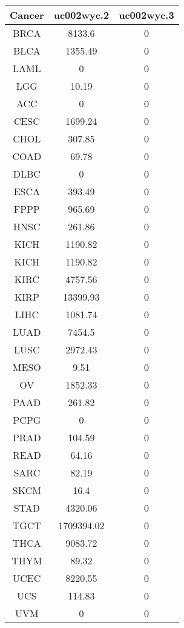\documentclass[11pt,a4paper]{report}
\author{Mazid OSSENI}
\begin{document}
\begin{tabular}{|c|c|c|}
\hline 
Cancer & uc002wyc.2 & uc002wyc.3 \\ 
\hline 
BRCA & 8133.6 & 0 \\ 
\hline 
BLCA & 1355.49 & 0 \\ 
\hline 
LAML & 0 & 0 \\ 
\hline 
LGG & 10.19 & 0 \\ 
\hline 
ACC & 0 & 0 \\ 
\hline 
CESC & 1699.24 & 0 \\ 
\hline 
CHOL & 307.85 & 0 \\ 
\hline 
COAD & 69.78 & 0 \\ 
\hline 
DLBC & 0 & 0 \\ 
\hline 
ESCA & 393.49 & 0 \\ 
\hline 
FPPP & 965.69 & 0 \\ 
\hline 
HNSC & 261.86 & 0 \\ 
\hline 
KICH & 1190.82 & 0 \\ 
\hline
KICH & 1190.82 & 0 \\ 
\hline
KIRC & 4757.56 & 0 \\ 
\hline
KIRP & 13399.93 & 0 \\ 
\hline
LIHC & 1081.74 & 0 \\ 
\hline
LUAD & 7454.5 & 0 \\
\hline
LUSC & 2972.43 & 0 \\
\hline
MESO & 9.51 & 0 \\
\hline
OV & 1852.33 & 0 \\
\hline
PAAD & 261.82 & 0 \\
\hline
PCPG & 0 & 0 \\
\hline
PRAD & 104.59 & 0 \\
\hline
READ & 64.16 & 0 \\
\hline
SARC & 82.19 & 0 \\
\hline
SKCM & 16.4 & 0 \\
\hline
STAD & 4320.06 & 0 \\
\hline
TGCT & 1709394.02 & 0 \\
\hline
THCA & 9083.72 & 0 \\
\hline
THYM & 89.32 & 0 \\
\hline
UCEC & 8220.55 & 0 \\
\hline
UCS & 114.83 & 0 \\
\hline
UVM & 0 & 0 \\
\hline
\end{tabular} 
\end{document}
